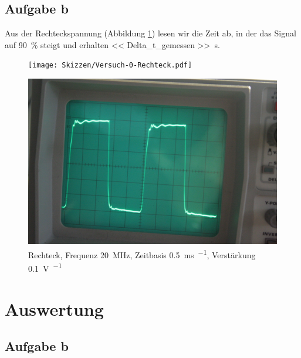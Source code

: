 \subsection{Aufgabe b}

Aus der Rechteckspannung (Abbildung \ref{fig:0749}) lesen wir die Zeit ab, in der das Signal auf \SI{90}{\percent} steigt und erhalten \SI{<< Delta_t_gemessen >>}{\second}.

\begin{figure}
	\centering
	\begin{minipage}{.45\linewidth}
		\texttt{[image: Skizzen/Versuch-0-Rechteck.pdf]}
	\end{minipage}
	\hfill
	\begin{minipage}{.45\linewidth}
	\includegraphics[width=\linewidth]{Fotos/IMG_0749-1500.jpg}
	\end{minipage}
	\caption{%
		Rechteck, Frequenz \SI{20}{\mega\hertz}, Zeitbasis \SI{.5}{\milli\second\per\division}, Verstärkung \SI{.1}{\volt\per\division}
	}
	\label{fig:0749}
\end{figure}


\section{Auswertung}

\subsection{Aufgabe b}

